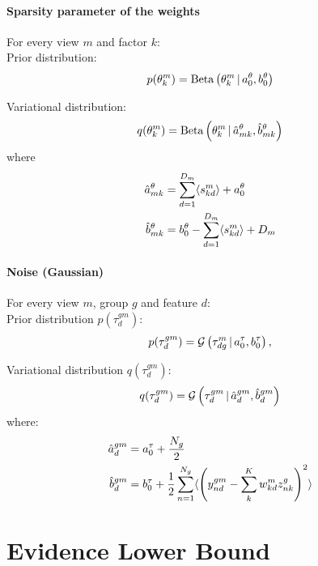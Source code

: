 \paragraph*{Sparsity parameter of the weights}

For every view $m$ and factor $k$: \\

Prior distribution:
\[
	p(\theta_k^m) = \text{Beta}\left(\theta_k^m \,|\, a_0^\theta,b_0^\theta\right)
\]

Variational distribution:
\begin{equation}
	q(\theta_k^m) = \text{Beta}\left(\theta_k^m \,|\, \hat{a}_{mk}^{\theta}, \hat{b}_{mk}^{\theta}\right)
\end{equation}
where
\begin{equation}
     \begin{aligned}
  	\hat{a}_{mk}^\theta &= \sum_{d=1}^{D_m} \langle s^m_{kd}\rangle + a_0^\theta\\
  	\hat{b}_{mk}^\theta &= b_0^\theta - \sum_{d=1}^{D_m} \langle s^m_{kd}\rangle + D_m
     \end{aligned}
\end{equation}


\paragraph*{Noise (Gaussian)}

For every view $m$, group $g$ and feature $d$:\\

Prior distribution $p(\tau_d^{gm})$:
\[
	p(\tau_d^{gm}) = \mathcal{G}\left(\tau_{dg}^m \,|\, a_0^\tau,b_0^\tau\right),
\]

Variational distribution $q(\tau_d^{gm})$:
\begin{equation}
	q(\tau_d^{gm}) = \mathcal{G}\left(\tau_d^{gm} \,|\, \hat{a}_{d}^{gm} , \hat{b}_{d}^{gm}\right)
\end{equation}
where:
\begin{equation} \begin{aligned}
	\hat{a}_{d}^{gm} &= a_0^{\tau} + \frac{N_g}{2}\\
	\hat{b}_{d}^{gm} &= b_0^{\tau} + \frac{1}{2} \sum_{n=1}^{N_g}  \langle\left(y_{nd}^{gm} - \sum_k^{K} w_{kd}^m z_{nk}^{g}\right)^2 \rangle
\end{aligned} \end{equation}


\section{Evidence Lower Bound}

